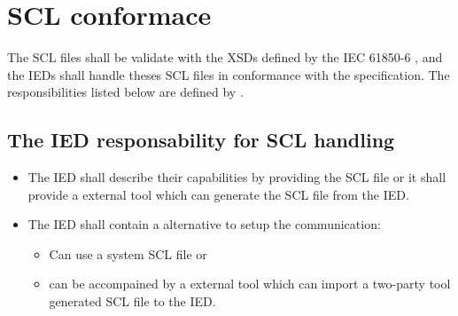 \section{SCL conformace}

The SCL files shall be validate with the 
\glspl{XSD} defined by the 
IEC 61850-6 \cite{IEC61850-6:2004} , and 
the IEDs shall handle theses SCL files 
in conformance with the specification.
The responsibilities listed below are 
defined by \cite[clause 5]{IEC61850-6:2004}. %

	\subsection{The IED responsability for SCL handling}
	\begin{itemize}
		\item 	The IED shall describe their capabilities by providing 
	 			the SCL file or it shall provide a external tool which 
	 			can generate the SCL file from the IED. 
	 	\item	The IED shall contain a alternative to setup the 
	 			communication: 
	 			
	 			\begin{itemize} 
                   \item Can use a system SCL file or 
                   \item can be accompained by a external 
                   		 tool which can import 
	 					 a two-party tool generated SCL file to the IED.
	 			 \end{itemize}
    \end{itemize}
 	 
